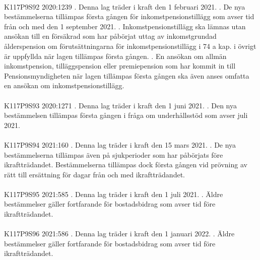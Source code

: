 \documentclass[a4paper,notitlepage,openany,10pt]{book}
\begin{document}
\paragraph*{}
{\tiny K117P9S92}
2020:1239
. Denna lag träder i kraft den 1 februari 2021.
. De nya bestämmelserna tillämpas första gången för inkomstpensionstillägg som avser tid från och med den 1 september 2021.
. Inkomstpensionstillägg ska lämnas utan ansökan till en försäkrad som har påbörjat uttag av inkomstgrundad ålderspension om förutsättningarna för inkomstpensionstillägg i 74 a kap. i övrigt är uppfyllda när lagen tillämpas första gången.
. En ansökan om allmän inkomstpension, tilläggspension eller premiepension som har kommit in till Pensionsmyndigheten när lagen tillämpas första gången ska även anses omfatta en ansökan om inkomstpensionstillägg.
\paragraph*{}
{\tiny K117P9S93}
2020:1271
. Denna lag träder i kraft den 1 juni 2021.
. Den nya bestämmelsen tillämpas första gången i fråga om underhållsstöd som avser juli 2021.
\paragraph*{}
{\tiny K117P9S94}
2021:160
. Denna lag träder i kraft den 15 mars 2021.
. De nya bestämmelserna tillämpas även på sjukperioder som har påbörjats före ikraftträdandet. Bestämmelserna tillämpas dock första gången vid prövning av rätt till ersättning för dagar från och med ikraftträdandet.
\paragraph*{}
{\tiny K117P9S95}
2021:585
. Denna lag träder i kraft den 1 juli 2021.
. Äldre bestämmelser gäller fortfarande för bostadsbidrag som avser tid före ikraftträdandet.
\paragraph*{}
{\tiny K117P9S96}
2021:586
. Denna lag träder i kraft den 1 januari 2022.
. Äldre bestämmelser gäller fortfarande för bostadsbidrag som avser tid före ikraftträdandet.
\end{document}
